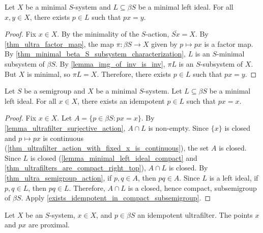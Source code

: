 \begin{lemma}
\label{lemma_ultrafilter_surjective_action}
\leanok{}
Let $X$ be a minimal $S$-system and $L \subseteq \beta S$ be a minimal left ideal.  For all $x, y \in X$, there exists $p \in L$ such that $px = y$.
\end{lemma}

\begin{proof}
\leanok{}
    Fix $x \in X$. By the minimality of the $S$-action, $\overline{Sx} = X$.  By \cref{thm_ultra_factor_map}, the map $\pi: \beta S \to X$ given by $p \mapsto px$ is a factor map.  By \cref{thm_minimal_beta_S_subsystem_characterization}, $L$ is an $S$-minimal subsystem of $\beta S$.  By \cref{lemma_img_of_inv_is_inv}, $\pi L$ is an $S$-subsystem of $X$.  But $X$ is minimal, so $\pi L = X$.  Therefore, there exists $p \in L$ such that $px = y$.
\end{proof}

\begin{lemma}
\label{lemma_exists_idempotent_px_is_x}
\leanok{}
Let $S$ be a semigroup and $X$ be a minimal $S$-system.  Let $L \subseteq \beta S$ be a minimal left ideal.  For all $x \in X$, there exists an idempotent $p \in L$ such that $px = x$.
\end{lemma}

\begin{proof}
\leanok{}
    Fix $x \in X$. Let $A = \{p \in \beta S : px = x\}$.  By \cref{lemma_ultrafilter_surjective_action}, $A \cap L$ is non-empty. Since $\{x\}$ is closed and $p \mapsto px$ is continuous (\cref{thm_ultrafilter_action_with_fixed_x_is_continuous}), the set $A$ is closed.  Since $L$ is closed (\cref{lemma_minimal_left_ideal_compact} and \cref{thm_ultrafilters_are_compact_right_top}), $A \cap L$ is closed. By \cref{thm_ultra_semigroup_action}, if $p, q \in A$, then $pq \in A$.  Since $L$ is a left ideal, if $p, q \in L$, then $pq \in L$.  Therefore, $A \cap L$ is a closed, hence compact, subsemigroup of $\beta S$. Apply \cref{exists_idempotent_in_compact_subsemigroup}.
\end{proof}

\begin{lemma}
    \label{lemma_idempotent_implies_proximal}
    \leanok{}
    Let $X$ be an $S$-system, $x \in X$, and $p \in \beta S$ an idempotent ultrafilter.  The points $x$ and $px$ are proximal.
\end{lemma}

